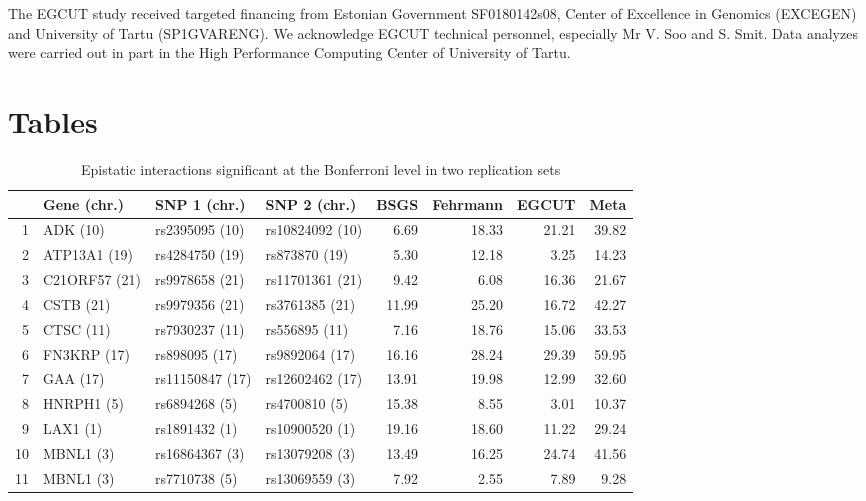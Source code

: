 \documentclass{article}
\begin{document}
The EGCUT study received targeted financing from Estonian Government SF0180142s08, Center of Excellence in Genomics (EXCEGEN) and University of Tartu (SP1GVARENG). We acknowledge EGCUT technical personnel, especially Mr V. Soo and S. Smit. Data analyzes were carried out in part in the High Performance Computing Center of University of Tartu.




\clearpage
\section{Tables}

\begin{table}[ht]
	\centering
	\begin{threeparttable}
		\caption{Epistatic interactions significant at the Bonferroni level in two replication sets}
		\label{tab:bonferroni}
		{\footnotesize
		\begin{tabular}{rlllrrrr}
  \hline
 & Gene (chr.) & SNP 1 (chr.) & SNP 2 (chr.) & BSGS\tnote{2} & Fehrmann\tnote{3} & EGCUT\tnote{3} & Meta\tnote{4} \\
  \hline
1 & ADK (10)  & rs2395095 (10)  & rs10824092 (10)  & 6.69\tnote{1} & 18.33\tnote{1} & 21.21\tnote{1} & 39.82\tnote{1} \\
  2 & ATP13A1 (19)  & rs4284750 (19)  & rs873870 (19)  & 5.30 & 12.18 & 3.25 & 14.23 \\
  3 & C21ORF57 (21)  & rs9978658 (21)  & rs11701361 (21)  & 9.42 & 6.08 & 16.36 & 21.67 \\
  4 & CSTB (21)  & rs9979356 (21)  & rs3761385 (21)  & 11.99 & 25.20 & 16.72 & 42.27 \\
  5 & CTSC (11)  & rs7930237 (11)  & rs556895 (11)  & 7.16 & 18.76 & 15.06 & 33.53 \\
  6 & FN3KRP (17)  & rs898095 (17)  & rs9892064 (17)  & 16.16 & 28.24 & 29.39 & 59.95 \\
  7 & GAA (17)  & rs11150847 (17)  & rs12602462 (17)  & 13.91 & 19.98 & 12.99 & 32.60 \\
  8 & HNRPH1 (5)  & rs6894268 (5)  & rs4700810 (5)  & 15.38 & 8.55 & 3.01 & 10.37 \\
  9 & LAX1 (1)  & rs1891432 (1)  & rs10900520 (1)  & 19.16 & 18.60 & 11.22 & 29.24 \\
  10 & MBNL1 (3)  & rs16864367 (3)  & rs13079208 (3)  & 13.49 & 16.25 & 24.74 & 41.56 \\
  11 & MBNL1 (3)  & rs7710738 (5)  & rs13069559 (3)  & 7.92 & 2.55 & 7.89 & 9.28 \\

\end{tabular}}
\end{threeparttable}
\end{table}
\end{document}
